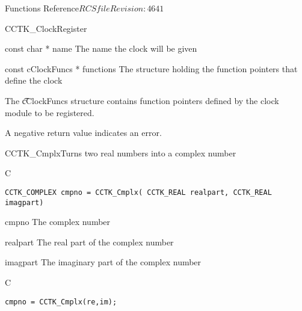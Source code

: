 \begin{cactuspart}{ Functions Reference}{$RCSfile$}{$Revision: 4641 $}
\begin{FunctionDescription}{CCTK\_ClockRegister}
\begin{ParameterSection}
\begin{Parameter}{const char * name}
The name the clock will be given
\end{Parameter}

\begin{Parameter}{const cClockFuncs * functions}
The structure holding the function pointers that define the clock
\end{Parameter}
\end{ParameterSection}

\begin{Discussion}
The {\t cClockFuncs} structure contains function pointers defined by
the clock module to be registered.
\end{Discussion}

\begin{ErrorSection}
\begin{Error}{}
A negative return value indicates an error.
\end{Error}
\end{ErrorSection}
\end{FunctionDescription}


\begin{FunctionDescription}{CCTK\_Cmplx}{Turns two real numbers into a complex number}
\label{CCTK-Cmplx}
\begin{SynopsisSection}
\begin{Synopsis}{C}
\begin{verbatim}CCTK_COMPLEX cmpno = CCTK_Cmplx( CCTK_REAL realpart, CCTK_REAL imagpart)\end{verbatim}
\end{Synopsis}
\end{SynopsisSection}
\begin{ParameterSection}
\begin{Parameter}{cmpno}
The complex number
\end{Parameter}
\begin{Parameter}{realpart}
The real part of the complex number
\end{Parameter}
\begin{Parameter}{imagpart}
The imaginary part of the complex number
\end{Parameter}
\end{ParameterSection}

\begin{ExampleSection}
\begin{Example}{C}
\begin{verbatim}
cmpno = CCTK_Cmplx(re,im);
\end{verbatim}
\end{Example}
\end{ExampleSection}
\end{FunctionDescription}



\end{cactuspart}
